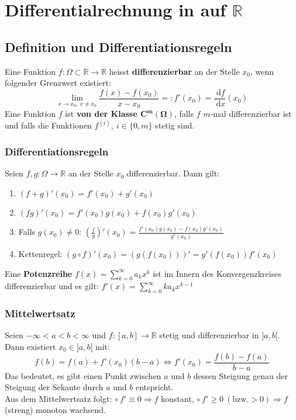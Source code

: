 \documentclass[a4paper,10pt]{scrartcl}
\newcommand{\diff}{\ \mathrm{d}}
\begin{document}
\section{Differentialrechnung in auf $\mathbb{R}$}
\subsection{Definition und Differentiationsregeln}
Eine Funktion $f:\Omega \subset \mathbb{R}\to \mathbb{R}$ heisst \textbf{differenzierbar} an der Stelle $x_0$, wenn folgender Grenzwert existiert: 
\begin{equation}
	\lim\limits_{x\to x_0, \ x\neq x_0} \frac{f(x)-f(x_0)}{x-x_0} =: f'(x_0) = \frac{\diff f}{\diff x} (x_0)
\end{equation}
Eine Funktion $f$ ist \textbf{von der Klasse $\boldsymbol{C^m(\Omega)}$}, falls $f$ $m$-mal differenzierbar ist und falls die Funktionen $f^{(i)}, \ i\in\{0,m\}$ stetig sind.   
\subsubsection{Differentiationsregeln}\label{DiffRegeln}
Seien $f,g:\Omega\to \mathbb{R}$ an der Stelle $x_0$ differenzierbar. Dann gilt: 
\begin{enumerate}[label=$\circ$]
	\item $(f+g)'(x_0)=f'(x_0)+g'(x_0)$
	\item $(fg)'(x_0) = f'(x_0)g(x_0) + f(x_0)g'(x_0)$
	\item Falls $g(x_0)\neq 0$: $\left(\frac{f}{g}\right)'(x_0)= \frac{f'(x_0)g(x_0) - f(x_0)g'(x_0)}{g^2(x_0)}$
	\item Kettenregel: $(g\circ f)'(x_0)=(g(f(x_0)))' = g'(f(x_0))f'(x_0)$
\end{enumerate}
Eine \textbf{Potenzreihe} $f(x)=\sum_{k=0}^{\infty} a_kx^k$ ist im Innern des Konvergenzkreises differenzierbar und es gilt: $f'(x)= \sum_{k=0}^{\infty}ka_kx^{k-1}$
\subsubsection{Mittelwertsatz}
Seien $-\infty <a<b<\infty$ und $f:[a,b]\to\mathbb{R}$ stetig und differenzierbar in $]a,b[$. Dann existiert $x_0\in ]a,b[$ mit:
\begin{equation}
	f(b)=f(a)+f'(x_0)(b-a) \Leftrightarrow 
	f'(x_0)=\frac{f(b)-f(a)}{b-a}
\end{equation}
Das bedeutet, es gibt einen Punkt zwischen $a$ und $b$ dessen Steigung genau der Steigung der Sekante durch $a$ und $b$ entspricht. \\
Aus dem Mittelwertsatz folgt: $\circ \ f'\equiv 0 \Rightarrow f$ konstant, $\circ \ f'\geq0 \ (\text{bzw.}>0) \Rightarrow f$ (streng) monoton wachsend. 
\end{document}
